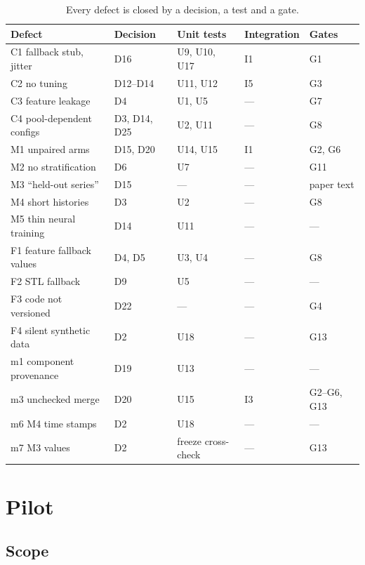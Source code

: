 \documentclass[11pt,a4paper]{article}
\begin{document}
\begin{table}[h]
\centering\small
\caption{Every defect is closed by a decision, a test and a gate.}\label{tab:trace}
\begin{tabular}{@{}lllll@{}}
\toprule
Defect & Decision & Unit tests & Integration & Gates \\
\midrule
C1 fallback stub, jitter & D16 & U9, U10, U17 & I1 & G1 \\
C2 no tuning & D12--D14 & U11, U12 & I5 & G3 \\
C3 feature leakage & D4 & U1, U5 & --- & G7 \\
C4 pool-dependent configs & D3, D14, D25 & U2, U11 & --- & G8 \\
M1 unpaired arms & D15, D20 & U14, U15 & I1 & G2, G6 \\
M2 no stratification & D6 & U7 & --- & G11 \\
M3 ``held-out series'' & D15 & --- & --- & paper text \\
M4 short histories & D3 & U2 & --- & G8 \\
M5 thin neural training & D14 & U11 & --- & --- \\
F1 feature fallback values & D4, D5 & U3, U4 & --- & G8 \\
F2 STL fallback & D9 & U5 & --- & --- \\
F3 code not versioned & D22 & --- & --- & G4 \\
F4 silent synthetic data & D2 & U18 & --- & G13 \\
m1 component provenance & D19 & U13 & --- & --- \\
m3 unchecked merge & D20 & U15 & I3 & G2--G6, G13 \\
m6 M4 time stamps & D2 & U18 & --- & --- \\
m7 M3 values & D2 & freeze cross-check & --- & G13 \\
\bottomrule
\end{tabular}
\end{table}

\section{Pilot}\label{sec:pilot}

\subsection{Scope}
\end{document}
